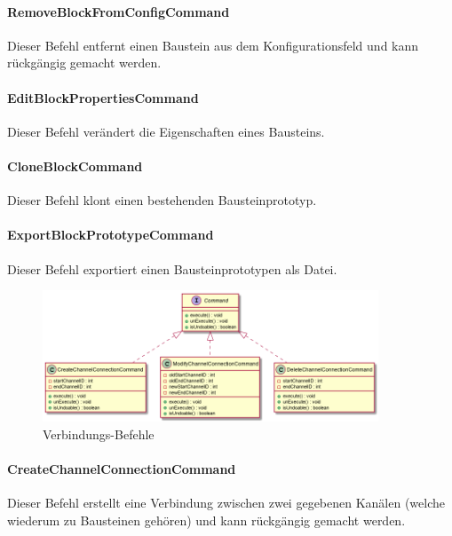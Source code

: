 \documentclass[parskip=full]{scrartcl}
\begin{document}
\paragraph{RemoveBlockFromConfigCommand}

Dieser Befehl entfernt einen Baustein aus dem Konfigurationsfeld und kann rückgängig gemacht werden.

\paragraph{EditBlockPropertiesCommand}

Dieser Befehl verändert die Eigenschaften eines Bausteins.

\paragraph{CloneBlockCommand}

Dieser Befehl klont einen bestehenden Bausteinprototyp.

\paragraph{ExportBlockPrototypeCommand}

Dieser Befehl exportiert einen Bausteinprototypen als Datei.

\begin{figure}[htbp]
	\begin{center}
		\includegraphics[width = 10cm]{Grafiken/Commands2.png}
		\caption{Verbindungs-Befehle}
		\label{Commands2}
	\end{center}
\end{figure}

\paragraph{CreateChannelConnectionCommand}

Dieser Befehl erstellt eine Verbindung zwischen zwei gegebenen Kanälen (welche wiederum zu Bausteinen gehören) und kann rückgängig gemacht werden.
\end{document}
